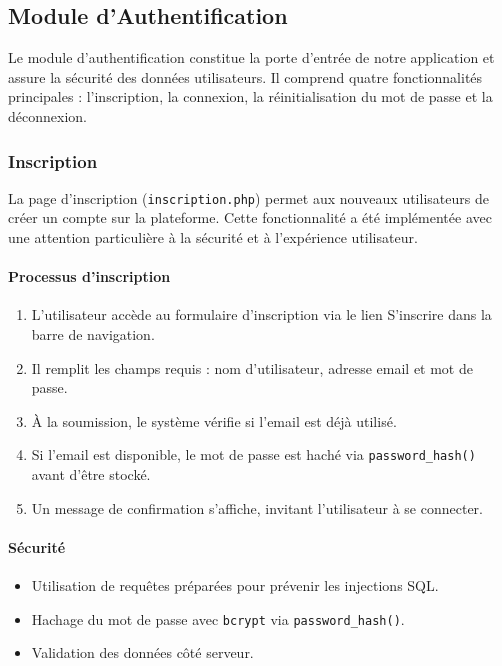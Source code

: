 \documentclass[a4paper,12pt]{article}
\begin{document}
\subsection{Module d'Authentification}

Le module d'authentification constitue la porte d'entrée de notre application et assure la sécurité des données utilisateurs.  
Il comprend quatre fonctionnalités principales : l'inscription, la connexion, la réinitialisation du mot de passe et la déconnexion.

\subsubsection{Inscription}

La page d'inscription (\texttt{inscription.php}) permet aux nouveaux utilisateurs de créer un compte sur la plateforme.  
Cette fonctionnalité a été implémentée avec une attention particulière à la sécurité et à l'expérience utilisateur.

\paragraph{Processus d'inscription}

\begin{enumerate}
  \item L'utilisateur accède au formulaire d'inscription via le lien \og S'inscrire \fg{} dans la barre de navigation.
  \item Il remplit les champs requis : nom d'utilisateur, adresse email et mot de passe.
  \item À la soumission, le système vérifie si l'email est déjà utilisé.
  \item Si l'email est disponible, le mot de passe est haché via \texttt{password\_hash()} avant d’être stocké.
  \item Un message de confirmation s’affiche, invitant l’utilisateur à se connecter.
\end{enumerate}

\paragraph{Sécurité}

\begin{itemize}
  \item Utilisation de requêtes préparées pour prévenir les injections SQL.
  \item Hachage du mot de passe avec \texttt{bcrypt} via \texttt{password\_hash()}.
  \item Validation des données côté serveur.
\end{itemize}
\end{document}
